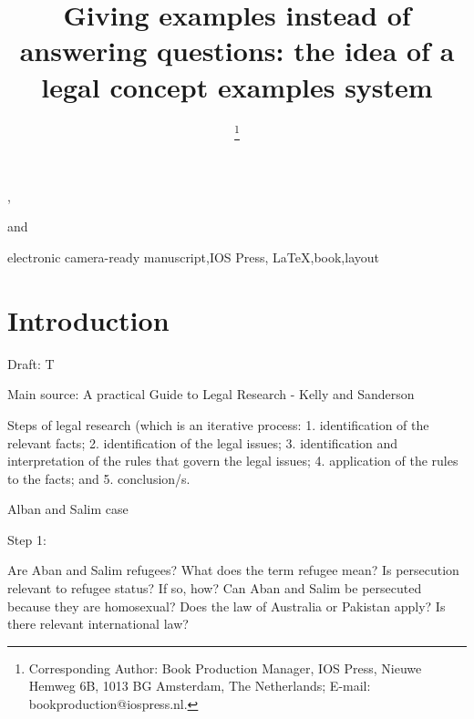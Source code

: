 \documentclass{IOS-Book-Article}
\begin{document}
\begin{frontmatter}              %

\title{Giving examples instead of answering questions: the idea of a legal concept examples system}

\author[A]{ %
\thanks{Corresponding Author: Book Production Manager, IOS Press, Nieuwe Hemweg 6B,
1013 BG Amsterdam, The Netherlands; E-mail:
bookproduction@iospress.nl.}},
\author[B]{ }
and
\author[B]{ }

\address[A]{Book Production Department, IOS Press, The Netherlands}
\address[B]{Short Affiliation of Second Author and Third Author}

\begin{abstract}

\end{abstract}

\begin{keyword}
electronic camera-ready manuscript\sep IOS Press\sep
\LaTeX\sep book\sep layout
\end{keyword}
\end{frontmatter}

\thispagestyle{empty}
\pagestyle{empty}

\section{Introduction}

Draft: T

Main source: A practical Guide to Legal Research - Kelly and Sanderson

Steps of legal research (which is an iterative process:
1. identification of the relevant facts;
2. identification of the legal issues;
3. identification and interpretation of the rules that govern the legal issues;
4. application of the rules to the facts; and
5. conclusion/s.

Alban and Salim case

Step 1:

Are Aban and Salim refugees? What does the term refugee mean?
Is persecution relevant to refugee status? If so, how?
Can Aban and Salim be persecuted because they are homosexual?
Does the law of Australia or Pakistan apply?
Is there relevant international law?
\end{document}
